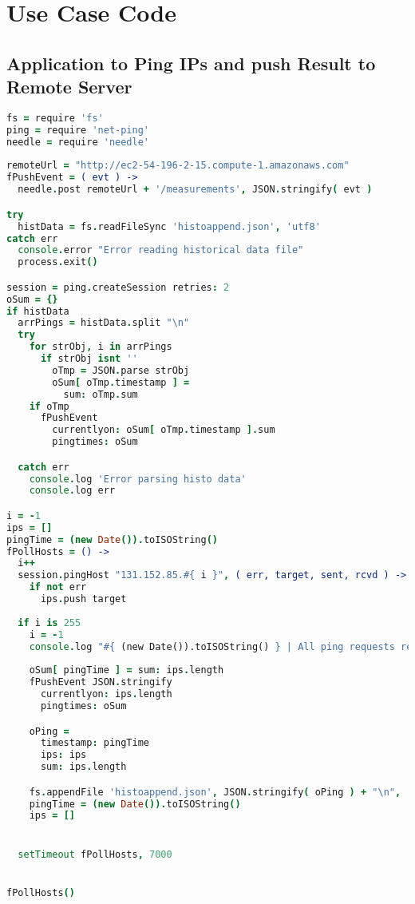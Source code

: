 
\chapter{Use Case Code}


\section{Application to Ping IPs and push Result to Remote Server}

\begin{lstlisting}[nolol,language=CoffeeScript,label={lst:eventproducer}]
fs = require 'fs'
ping = require 'net-ping'
needle = require 'needle'
    
remoteUrl = "http://ec2-54-196-2-15.compute-1.amazonaws.com"
fPushEvent = ( evt ) ->
  needle.post remoteUrl + '/measurements', JSON.stringify( evt )

try
  histData = fs.readFileSync 'histoappend.json', 'utf8'
catch err
  console.error "Error reading historical data file"
  process.exit()

session = ping.createSession retries: 2
oSum = {}
if histData
  arrPings = histData.split "\n"
  try
    for strObj, i in arrPings
      if strObj isnt ''
        oTmp = JSON.parse strObj  
        oSum[ oTmp.timestamp ] = 
          sum: oTmp.sum
    if oTmp
      fPushEvent
        currentlyon: oSum[ oTmp.timestamp ].sum
        pingtimes: oSum   

  catch err
    console.log 'Error parsing histo data'
    console.log err

i = -1
ips = []
pingTime = (new Date()).toISOString()
fPollHosts = () ->
  i++
  session.pingHost "131.152.85.#{ i }", ( err, target, sent, rcvd ) ->
    if not err
      ips.push target
      
  if i is 255
    i = -1
    console.log "#{ (new Date()).toISOString() } | All ping requests returned (#{ips.length} answered), pushing event into the system and starting again at 0"
    
    oSum[ pingTime ] = sum: ips.length
    fPushEvent JSON.stringify
      currentlyon: ips.length
      pingtimes: oSum

    oPing = 
      timestamp: pingTime
      ips: ips
      sum: ips.length

    fs.appendFile 'histoappend.json', JSON.stringify( oPing ) + "\n", 'utf8'
    pingTime = (new Date()).toISOString()
    ips = []


  setTimeout fPollHosts, 7000


fPollHosts()


\end{lstlisting}
